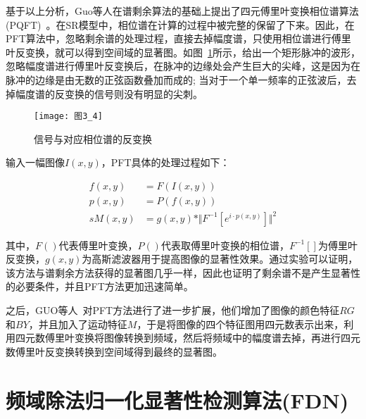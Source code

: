基于以上分析，Guo等人在谱剩余算法的基础上提出了四元傅里叶变换相位谱算法(PQFT)~\cite{GuoChenleiCVPR2008Spatio}。在SR模型中，相位谱在计算的过程中被完整的保留了下来。因此，在PFT算法中，忽略剩余谱的处理过程，直接去掉幅度谱，只使用相位谱进行傅里叶反变换，就可以得到空间域的显著图。如图~\ref{图3_4}所示，给出一个矩形脉冲的波形，忽略幅度谱进行傅里叶反变换后，在脉冲的边缘处会产生巨大的尖峰，这是因为在脉冲的边缘是由无数的正弦函数叠加而成的; 当对于一个单一频率的正弦波后，去掉幅度谱的反变换的信号则没有明显的尖刺。
\begin{figure}[!t] %
\centering
\texttt{[image: 图3\_4]}
\caption{信号与对应相位谱的反变换}
\label{图3_4}
\end{figure}

输入一幅图像$I(x,y)$，PFT具体的处理过程如下：
\begin{linenomath}
\begin{align}
f(x,y) &= F(I(x,y))\label{式3_11}\\
p(x,y) &= P(f(x,y))\label{式3_12}\\
sM(x,y) &= g(x,y)\ast\Vert F^{-1}[e^{i\cdot p(x,y)}]\Vert^{2}\label{式3_13}
\end{align}
\end{linenomath}
其中，$F()$代表傅里叶变换，$P()$代表取傅里叶变换的相位谱，$F^{-1}[]$为傅里叶反变换，$g(x,y)$为高斯滤波器用于提高图像的显著性效果。通过实验可以证明，该方法与谱剩余方法获得的显著图几乎一样，因此也证明了剩余谱不是产生显著性的必要条件，并且PFT方法更加迅速简单。

之后，GUO等人~\cite{GuoChenleiCVPR2008Spatio}对PFT方法进行了进一步扩展，他们增加了图像的颜色特征$RG$和$BY$，并且加入了运动特征$M$，于是将图像的四个特征图用四元数表示出来，利用四元数傅里叶变换将图像转换到频域，然后将频域中的幅度谱去掉，再进行四元数傅里叶反变换转换到空间域得到最终的显著图。

\section{频域除法归一化显著性检测算法(FDN)}
\label{3_3}

